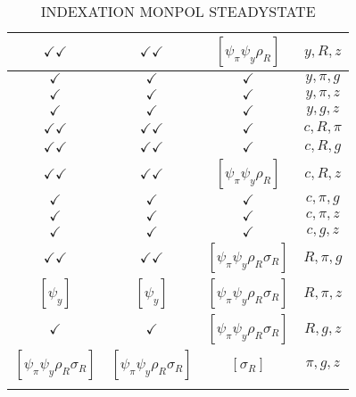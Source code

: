 \documentclass[a4paper,10pt]{article}
\begin{document}
\begin{longtable}{|c|c|c|c|}
\hline
$\checkmark\checkmark$ & $\checkmark\checkmark$ & $[\psi_\pi \psi_y \rho_R ]$ & ${y},{R},{z}$ \\
\hline
$\checkmark$ & $\checkmark$ & $\checkmark$ & ${y},{\pi},{g}$ \\
\hline
$\checkmark$ & $\checkmark$ & $\checkmark$ & ${y},{\pi},{z}$ \\
\hline
$\checkmark$ & $\checkmark$ & $\checkmark$ & ${y},{g},{z}$ \\
\hline
$\checkmark\checkmark$ & $\checkmark\checkmark$ & $\checkmark$ & ${c},{R},{\pi}$ \\
\hline
$\checkmark\checkmark$ & $\checkmark\checkmark$ & $\checkmark$ & ${c},{R},{g}$ \\
\hline
$\checkmark\checkmark$ & $\checkmark\checkmark$ & $[\psi_\pi \psi_y \rho_R ]$ & ${c},{R},{z}$ \\
\hline
$\checkmark$ & $\checkmark$ & $\checkmark$ & ${c},{\pi},{g}$ \\
\hline
$\checkmark$ & $\checkmark$ & $\checkmark$ & ${c},{\pi},{z}$ \\
\hline
$\checkmark$ & $\checkmark$ & $\checkmark$ & ${c},{g},{z}$ \\
\hline
$\checkmark\checkmark$ & $\checkmark\checkmark$ & $[\psi_\pi \psi_y \rho_R \sigma_R ]$ & ${R},{\pi},{g}$ \\
\hline
$[\psi_y ]$ & $[\psi_y ]$ & $[\psi_\pi \psi_y \rho_R \sigma_R ]$ & ${R},{\pi},{z}$ \\
\hline
$\checkmark$ & $\checkmark$ & $[\psi_\pi \psi_y \rho_R \sigma_R ]$ & ${R},{g},{z}$ \\
\hline
$[\psi_\pi \psi_y \rho_R \sigma_R ]$ & $[\psi_\pi \psi_y \rho_R \sigma_R ]$ & $[\sigma_R ]$ & ${\pi},{g},{z}$ \\
\hline
\caption{INDEXATION MONPOL STEADYSTATE}
\label{table:MyTableLabel}
\end{longtable}
\end{document}
